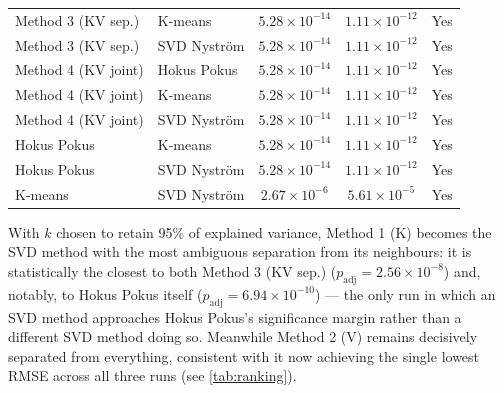 \begin{table}[H]
\begin{tabular}{ll cc c}
Method 3 (KV sep.) & K-means              & $5.28 \times 10^{-14}$ & $1.11 \times 10^{-12}$ & Yes \\
Method 3 (KV sep.) & SVD Nyström          & $5.28 \times 10^{-14}$ & $1.11 \times 10^{-12}$ & Yes \\
\addlinespace
Method 4 (KV joint) & Hokus Pokus         & $5.28 \times 10^{-14}$ & $1.11 \times 10^{-12}$ & Yes \\
Method 4 (KV joint) & K-means             & $5.28 \times 10^{-14}$ & $1.11 \times 10^{-12}$ & Yes \\
Method 4 (KV joint) & SVD Nyström         & $5.28 \times 10^{-14}$ & $1.11 \times 10^{-12}$ & Yes \\
\addlinespace
Hokus Pokus         & K-means             & $5.28 \times 10^{-14}$ & $1.11 \times 10^{-12}$ & Yes \\
Hokus Pokus         & SVD Nyström         & $5.28 \times 10^{-14}$ & $1.11 \times 10^{-12}$ & Yes \\
\addlinespace
K-means             & SVD Nyström         & $2.67 \times 10^{-6}$  & $5.61 \times 10^{-5}$  & Yes \\
\bottomrule
\end{tabular}
\end{table}

\noindent With $k$ chosen to retain 95\% of explained variance, Method 1 (K) becomes the SVD
method with the most ambiguous separation from its neighbours: it is statistically the closest
to both Method 3 (KV sep.) ($p_\text{adj} = 2.56\times10^{-8}$) and, notably, to Hokus Pokus itself
($p_\text{adj} = 6.94\times10^{-10}$) --- the only run in which an SVD method approaches Hokus
Pokus's significance margin rather than a different SVD method doing so. Meanwhile Method 2 (V)
remains decisively separated from everything, consistent with it now achieving the single lowest
RMSE across all three runs (see \autoref{tab:ranking}).



